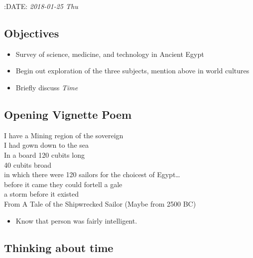 \documentclass[11pt]{article}
\begin{document}
:DATE: \textit{2018-01-25 Thu}

\subsection{Objectives}
\label{sec-4.1}

\begin{itemize}
\item Survey of science, medicine, and technology in Ancient Egypt
\item Begin out exploration of the three subjects, mention above in world cultures
\item Briefly discuss \emph{Time}
\end{itemize}
\subsection{Opening Vignette \label{Poem}Poem}
\label{sec-4.2}

I have a Mining region of the sovereign\\
I had gown down to the sea\\
In a board 120 cubits long\\
40 cubits broad\\
in which there were 120 sailors for the choicest of Egypt\ldots{}\\
before it came they could fortell a gale\\
a storm before it existed\\

From A Tale of the Shipwrecked Sailor (Maybe from 2500 BC)

\begin{itemize}
\item Know that person was fairly intelligent.
\end{itemize}
\subsection{Thinking about time}
\label{sec-4.3}
\end{document}
